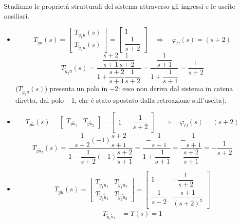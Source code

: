 \documentclass[../main.tex]{subfiles}
\begin{document}
\begin{mdframed}[style=Exercise]
\begin{Exercise}[title={Studio di un sistema dato in $ T(s) $}]
				Studiamo le propriet\'a strutturali del sistema attraverso gli ingressi e le uscite ausiliari.
				\begin{itemize}
					\item
						\[
							T_{\tilde y u}(s) =
							\begin{bmatrix}
								T_{\tilde y_1 u}(s)
								\\[1em]
								T_{\tilde y_2 u}(s)
							\end{bmatrix} =
							\begin{bmatrix}
								1
								\\[1em]
								\dfrac{1}{s+2}
							\end{bmatrix}
							\quad\Rightarrow\quad
							\varphi_C(s) = (s+2)
						\]
						\[
							T_{\tilde y_2 u}(s) = \dfrac{\dfrac{s+2}{s+1}\dfrac{1}{s+2}}{1+\dfrac{s+2}{s+1}\dfrac{1}{s+2}} = \dfrac{\dfrac{1}{s+1}}{1+\dfrac{1}{s+1}} = \dfrac{1}{s+2}
						\]
						($ T_{\tilde y_2 u}(s) $) presenta un polo in $ -2 $: esso non deriva dal sistema in catena diretta, dal polo $ -1 $, che \'e stato spostato dalla retroazione sull'uscita).
					\item 
						\[
							T_{y \tilde u}(s) = 
							\begin{bmatrix}
								T_{y \tilde u_1} & T_{y \tilde u_2}
							\end{bmatrix} =
							\begin{bmatrix}
								1 & -\dfrac{1}{s+2}
							\end{bmatrix}
							\quad\Rightarrow\quad
							\varphi_O(s) = (s+2)
						\]
						\[
							T_{y \tilde u_2}(s) = \dfrac{\dfrac{1}{s+2}(-1)\dfrac{s+2}{s+1}}{1-\dfrac{1}{s+2}(-1)\dfrac{s+2}{s+1}} =
							\dfrac{-\dfrac{1}{s+1}}{1+\dfrac{1}{s+1}} =
							\dfrac{-\dfrac{1}{s+1}}{\dfrac{s+2}{s+1}} =
							-\dfrac{1}{s+2}
						\]
					\item 
						\[
							T_{\tilde y \tilde u}(s) = 
							\begin{bmatrix}
								T_{\tilde y_1 \tilde u_1} & T_{\tilde y_1 \tilde u_2}
								\\[1em]
								T_{\tilde y_2 \tilde u_1} & T_{\tilde y_2 \tilde u_2}
							\end{bmatrix} =
							\begin{bmatrix}
								1 & -\dfrac{1}{s+2}
								\\[1em]
								\dfrac{1}{s+2} & \dfrac{s+1}{(s+2)^2}
							\end{bmatrix}
						\]
						\[
							\begin{aligned}
								T_{\tilde y_1 \tilde u_1} &= T(s) = 1

\end{aligned}\]
\end{itemize}
\end{Exercise}
\end{mdframed}
\end{document}
